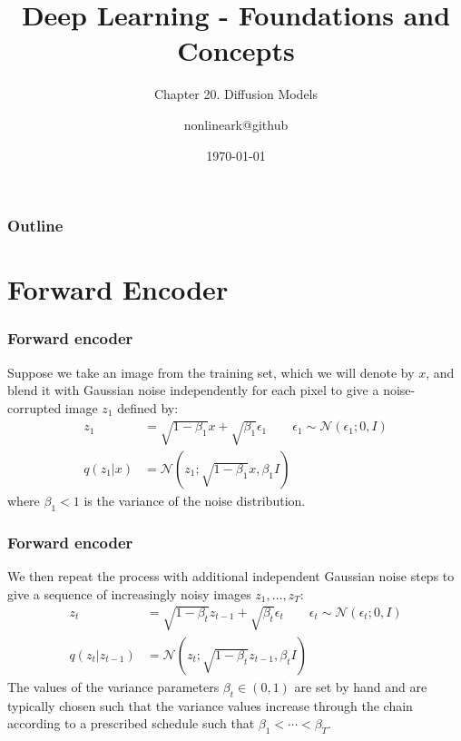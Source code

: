 \documentclass{beamer}
\title{Deep Learning - Foundations and Concepts}
\subtitle{Chapter 20. Diffusion Models}
\author{nonlineark@github}
\date{\today}
\begin{document}
\begin{frame}
    \titlepage
\end{frame}

\begin{frame}
    \frametitle{Outline}
    \tableofcontents
\end{frame}

\section{Forward Encoder}

\begin{frame}
    \frametitle{Forward encoder}
    Suppose we take an image from the training set, which we will denote by $x$, and blend it with Gaussian noise independently for each pixel to give a noise-corrupted image $z_{1}$ defined by:
    \begin{align*}
        z_{1}&=\sqrt{1-\beta_{1}}x+\sqrt{\beta_{1}}\epsilon_{1}\qquad\epsilon_{1}\sim\mathcal{N}(\epsilon_{1};0,I) \\
        q(z_{1}|x)&=\mathcal{N}(z_{1};\sqrt{1-\beta_{1}}x,\beta_{1}I)
    \end{align*}
    where $\beta_{1}<1$ is the variance of the noise distribution.
\end{frame}

\begin{frame}
    \frametitle{Forward encoder}
    We then repeat the process with additional independent Gaussian noise steps to give a sequence of increasingly noisy images $z_{1},\hdots,z_{T}$:
    \begin{align*}
        z_{t}&=\sqrt{1-\beta_{t}}z_{t-1}+\sqrt{\beta_{t}}\epsilon_{t}\qquad\epsilon_{t}\sim\mathcal{N}(\epsilon_{t};0,I) \\
        q(z_{t}|z_{t-1})&=\mathcal{N}(z_{t};\sqrt{1-\beta_{t}}z_{t-1},\beta_{t}I)
    \end{align*}
    The values of the variance parameters $\beta_{t}\in(0,1)$ are set by hand and are typically chosen such that the variance values increase through the chain according to a prescribed schedule such that $\beta_{1}<\cdots<\beta_{T}$.
\end{frame}
\end{document}
